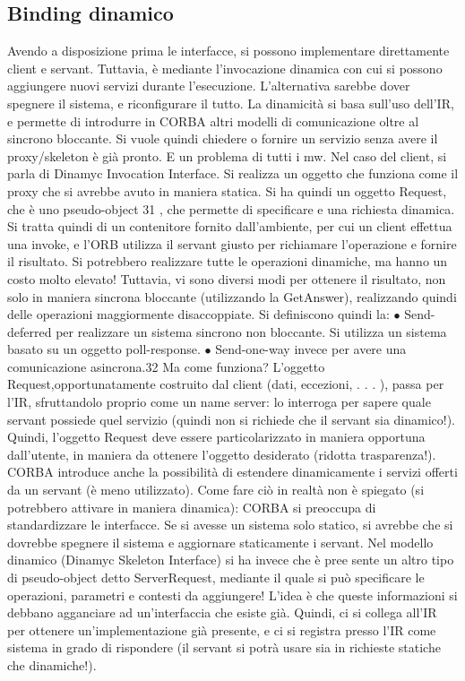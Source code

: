 \subsection{Binding dinamico}
Avendo a disposizione prima le interfacce, si possono implementare direttamente client e servant. Tuttavia, è mediante
l'invocazione dinamica con cui
si possono aggiungere nuovi servizi durante l'esecuzione. L'alternativa sarebbe
dover spegnere il sistema, e riconfigurare il tutto. La dinamicità si basa sull'uso
dell'IR, e permette di introdurre in CORBA altri modelli di comunicazione oltre
al sincrono bloccante.
Si vuole quindi chiedere o fornire un servizio senza avere il proxy/skeleton è già pronto. E un problema di tutti i mw.
Nel caso del client, si parla di Dinamyc Invocation Interface. Si realizza un oggetto che funziona come il proxy che si
avrebbe avuto in maniera statica. Si ha quindi un oggetto Request, che è uno pseudo-object 31 , che permette di
specificare e una richiesta dinamica. Si tratta quindi di un contenitore fornito dall'ambiente,
per cui un client effettua una invoke, e l'ORB utilizza il servant giusto per
richiamare l'operazione e fornire il risultato. Si potrebbero realizzare tutte le
operazioni dinamiche, ma hanno un costo molto elevato! Tuttavia, vi sono
diversi modi per ottenere il risultato, non solo in maniera sincrona bloccante
(utilizzando la GetAnswer), realizzando quindi delle operazioni maggiormente
disaccoppiate. Si definiscono quindi la:
$\bullet$ Send-deferred per realizzare un sistema sincrono non bloccante. Si utilizza
un sistema basato su un oggetto poll-response.
$\bullet$ Send-one-way invece per avere una comunicazione asincrona.32
Ma come funziona? L'oggetto Request,opportunatamente costruito dal client
(dati, eccezioni, . . . ), passa per l'IR, sfruttandolo proprio come un name server: lo interroga per sapere quale
servant possiede quel servizio (quindi non si
richiede che il servant sia dinamico!). Quindi, l'oggetto Request deve essere particolarizzato in maniera opportuna
dall'utente, in maniera da ottenere l'oggetto
desiderato (ridotta trasparenza!).
CORBA introduce anche la possibilità di estendere dinamicamente i servizi
offerti da un servant (è meno utilizzato). Come fare ciò in realtà non è spiegato
(si potrebbero attivare in maniera dinamica): CORBA si preoccupa di standardizzare le interfacce. Se si avesse un
sistema solo statico, si avrebbe che si
dovrebbe spegnere il sistema e aggiornare staticamente i servant.
Nel modello dinamico (Dinamyc Skeleton Interface) si ha invece che è pree
sente un altro tipo di pseudo-object detto ServerRequest, mediante il quale si può
specificare le operazioni, parametri e contesti da aggiungere! L'idea è che queste
informazioni si debbano agganciare ad un'interfaccia che esiste già. Quindi, ci
si collega all'IR per ottenere un'implementazione già presente, e ci si registra
presso l'IR come sistema in grado di rispondere (il servant si potrà usare sia in
richieste statiche che dinamiche!).
